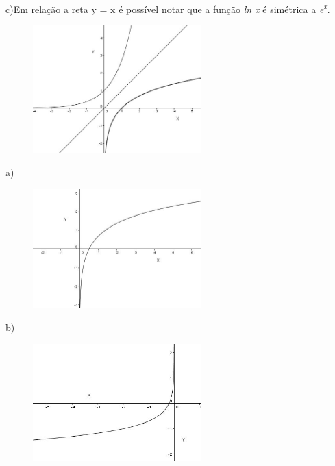\begin{respostas}{7}
\begin{multicols}{2}
c)Em relação a reta y = x é possível notar que a função \textit{ln x} é simétrica a \textit{e\textsuperscript{x}}.
\begin{figure}[H]
    \begin{Center}
        \includegraphics[width=2.55in,height=1.94in]{capitulos/logaritmos_e_funcao_logaritmica/media/image25.JPG}
    \end{Center}    
\end{figure} 

    \ansitem{}

a)\begin{figure}[H]
	\begin{Center}
		\includegraphics[width=2.56in,height=1.81in]{capitulos/logaritmos_e_funcao_logaritmica/media/image26.JPG}
	\end{Center}
\end{figure}

b)\begin{figure}[H]
	\begin{Center}
		\includegraphics[width=2.56in,height=1.78in]{capitulos/logaritmos_e_funcao_logaritmica/media/image27.JPG}
	\end{Center}
\end{figure}


\end{multicols}
\end{respostas}
